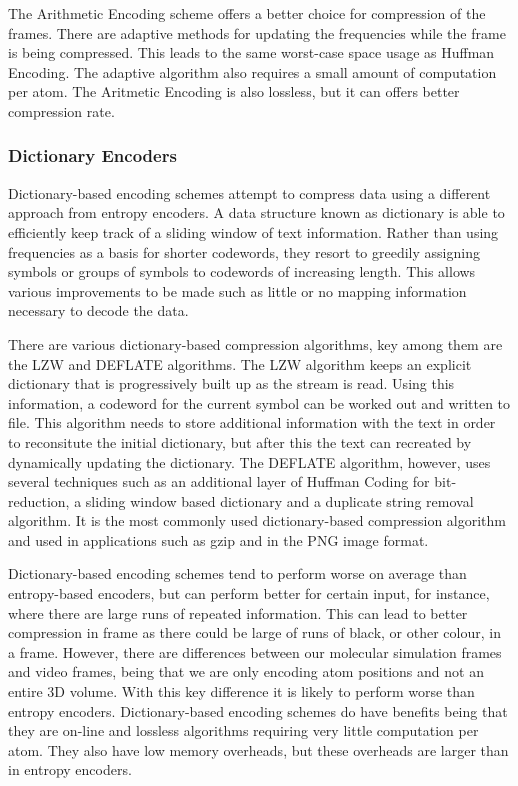 \documentclass[twocolumn, a4paper,10pt]{article}
\begin{document}
The Arithmetic Encoding scheme offers a better choice for compression of the frames. There are adaptive methods for updating the frequencies while the frame is being compressed. This leads to the same worst-case space usage as Huffman Encoding. The adaptive algorithm also requires a small amount of computation per atom. The Aritmetic Encoding is also lossless, but it can offers better compression rate.

\subsubsection*{Dictionary Encoders}

Dictionary-based encoding schemes attempt to compress data using a different approach from entropy encoders\cite{RefWorks:2}. A data structure known as dictionary is able to efficiently keep track of a sliding window of text information. Rather than using frequencies as a basis for shorter codewords, they resort to greedily assigning symbols or groups of symbols to codewords of increasing length. This allows various improvements to be made such as little or no mapping information necessary to decode the data.

There are various dictionary-based compression algorithms, key among them are the LZW and DEFLATE algorithms. The LZW algorithm keeps an explicit dictionary that is progressively built up as the stream is read.\cite{1320134} Using this information, a codeword for the current symbol can be worked out and written to file. This algorithm needs to store additional information with the text in order to reconsitute the initial dictionary, but after this the text can recreated by dynamically updating the dictionary. The DEFLATE algorithm, however, uses several techniques such as an additional layer of Huffman Coding for bit-reduction, a sliding window based dictionary and a duplicate string removal algorithm\cite{deflaterfc}. It is the most commonly used dictionary-based compression algorithm and used in applications such as gzip and in the PNG image format. 

Dictionary-based encoding schemes tend to perform worse on average than entropy-based encoders, but can perform better for certain input, for instance, where there are large runs of repeated information. This can lead to better compression in frame as there could be large of runs of black, or other colour, in a frame. However, there are differences between our molecular simulation frames and video frames, being that we are only encoding atom positions and not an entire 3D volume. With this key difference it is likely to perform worse than entropy encoders. Dictionary-based encoding schemes do have benefits being that they are on-line and lossless algorithms requiring very little computation per atom. They also have low memory overheads, but these overheads are larger than in entropy encoders. 
\end{document}
